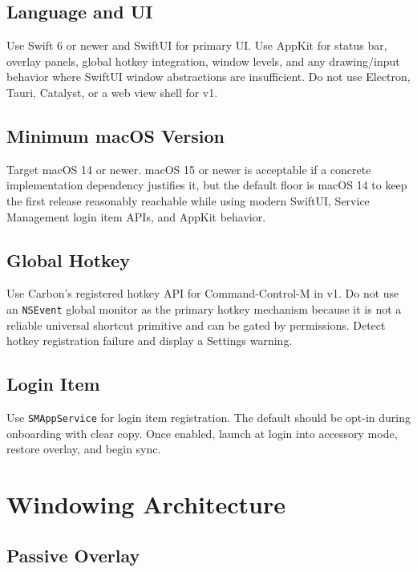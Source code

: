 \documentclass[11pt]{article}
\begin{document}
\subsection{Language and UI}

Use Swift 6 or newer and SwiftUI for primary UI. Use AppKit for status bar, overlay panels, global hotkey integration, window levels, and any drawing/input behavior where SwiftUI window abstractions are insufficient. Do not use Electron, Tauri, Catalyst, or a web view shell for v1.

\subsection{Minimum macOS Version}

Target macOS 14 or newer. macOS 15 or newer is acceptable if a concrete implementation dependency justifies it, but the default floor is macOS 14 to keep the first release reasonably reachable while using modern SwiftUI, Service Management login item APIs, and AppKit behavior.

\subsection{Global Hotkey}

Use Carbon's registered hotkey API for Command-Control-M in v1. Do not use an \texttt{NSEvent} global monitor as the primary hotkey mechanism because it is not a reliable universal shortcut primitive and can be gated by permissions. Detect hotkey registration failure and display a Settings warning.

\subsection{Login Item}

Use \texttt{SMAppService} for login item registration. The default should be opt-in during onboarding with clear copy. Once enabled, launch at login into accessory mode, restore overlay, and begin sync.

\section{Windowing Architecture}

\subsection{Passive Overlay}
\end{document}
